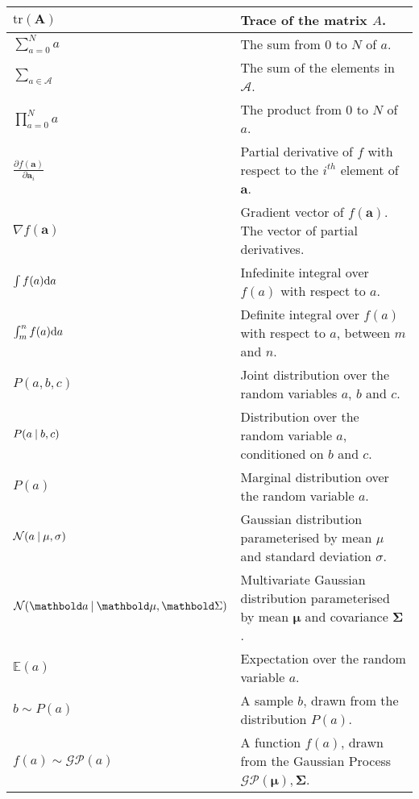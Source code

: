 \begin{longtable}{p{} | p{}}
  \( \text{tr}(\bm{A}) \) & Trace of the matrix \( A \).\\
  \midrule
  \(\sum_{a = 0}^{N} a\) & The sum from \( 0 \) to \( N \) of \( a \).\\
  \(\sum_{a \in \mathcal{A}}\) & The sum of the elements in \( \mathcal{A} \).\\
  \(\prod_{a = 0}^{N} a\) & The product from \( 0 \) to \( N \) of \( a \).\\
  \midrule
  \( \frac{\partial f(\bm{a})}{\partial \bm{a}_{i}} \) & Partial derivative of \( f \) with respect to the \( i^{th} \) element of \( \bm{a} \).\\
  \( \nabla f(\bm{a}) \) & Gradient vector of \( f(\bm{a}) \). The vector of partial derivatives.\\
  \( \int f(a) {\mathrm d{a}} \) & Infedinite integral over \( f(a) \) with respect to \( a \).\\
  \( \int_{m}^{n} f(a) {\mathrm d{a}} \) & Definite integral over \( f(a) \) with respect to \( a \), between \( m \) and \( n \).\\
  \midrule
  \( P(a, b, c) \) & Joint distribution over the random variables \( a \), \( b \) and \( c \).\\
  \( P(a \:\vert\: b, c) \) & Distribution over the random variable \( a \), conditioned on \( b \) and \( c \).\\
  \( P(a) \) & Marginal distribution over the random variable \( a \).\\
  \( \mathcal{N}(a \:\vert\: \mu, \sigma) \) & Gaussian distribution parameterised by mean \( \mu \) and standard deviation \( \sigma \).\\
  \( \mathcal{N}(\bm{a} \given \bm{\mu}, \bm{\Sigma}) \) & Multivariate Gaussian distribution parameterised by mean \( \bm{\mu} \) and covariance \( \bm{\Sigma} \).\\
  \( \mathbb{E}(a) \) & Expectation over the random variable \( a \).\\
  \( b \sim P(a) \) & A sample \( b \), drawn from the distribution \( P(a) \).\\
  \( f(a) \sim \mathcal{GP}(a) \) & A function \( f(a) \), drawn from the Gaussian Process \( \mathcal{GP}(\bm{\mu}), \bm{\Sigma} \).
~\label{table:mathematical_notation}
\end{longtable}

